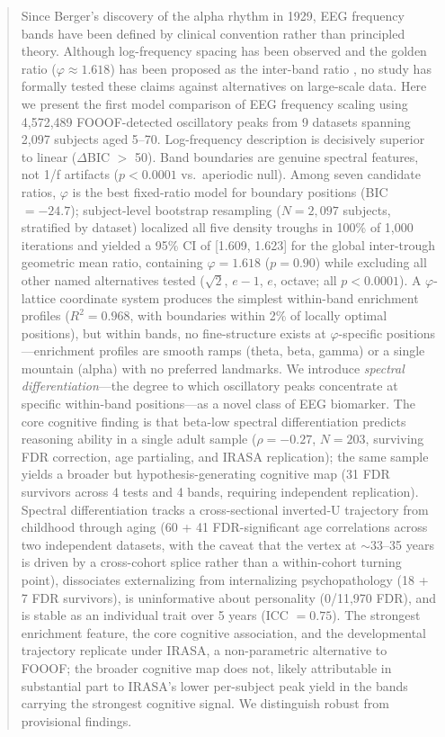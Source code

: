 \documentclass[11pt,a4paper]{article}
\newcommand{\phisym}{\varphi}
\begin{document}
\begin{abstract}
Since Berger's discovery of the alpha rhythm in 1929, EEG frequency bands have been defined by clinical convention rather than principled theory. Although log-frequency spacing has been observed \parencite{penttonen2003natural} and the golden ratio ($\phisym \approx 1.618$) has been proposed as the inter-band ratio \parencite{pletzer2010golden,kramer2023golden}, no study has formally tested these claims against alternatives on large-scale data. Here we present the first model comparison of EEG frequency scaling using 4,572,489 FOOOF-detected oscillatory peaks from 9 datasets spanning 2,097 subjects aged 5--70. Log-frequency description is decisively superior to linear ($\Delta$BIC $>$ 50). Band boundaries are genuine spectral features, not 1/f artifacts ($p < 0.0001$ vs.\ aperiodic null). Among seven candidate ratios, $\phisym$ is the best fixed-ratio model for boundary positions (BIC $= -24.7$); subject-level bootstrap resampling ($N = 2{,}097$ subjects, stratified by dataset) localized all five density troughs in 100\% of 1,000 iterations and yielded a 95\% CI of [1.609, 1.623] for the global inter-trough geometric mean ratio, containing $\phisym = 1.618$ ($p = 0.90$) while excluding all other named alternatives tested ($\sqrt{2}$, $e-1$, $e$, octave; all $p < 0.0001$). A $\phisym$-lattice coordinate system produces the simplest within-band enrichment profiles ($R^2 = 0.968$, with boundaries within 2\% of locally optimal positions), but within bands, no fine-structure exists at $\phisym$-specific positions---enrichment profiles are smooth ramps (theta, beta, gamma) or a single mountain (alpha) with no preferred landmarks. We introduce \emph{spectral differentiation}---the degree to which oscillatory peaks concentrate at specific within-band positions---as a novel class of EEG biomarker. The core cognitive finding is that beta-low spectral differentiation predicts reasoning ability in a single adult sample ($\rho = -0.27$, $N = 203$, surviving FDR correction, age partialing, and IRASA replication); the same sample yields a broader but hypothesis-generating cognitive map (31 FDR survivors across 4 tests and 4 bands, requiring independent replication). Spectral differentiation tracks a cross-sectional inverted-U trajectory from childhood through aging (60 + 41 FDR-significant age correlations across two independent datasets, with the caveat that the vertex at $\sim$33--35 years is driven by a cross-cohort splice rather than a within-cohort turning point), dissociates externalizing from internalizing psychopathology (18 + 7 FDR survivors), is uninformative about personality (0/11,970 FDR), and is stable as an individual trait over 5 years (ICC $= 0.75$). The strongest enrichment feature, the core cognitive association, and the developmental trajectory replicate under IRASA, a non-parametric alternative to FOOOF; the broader cognitive map does not, likely attributable in substantial part to IRASA's lower per-subject peak yield in the bands carrying the strongest cognitive signal. We distinguish robust from provisional findings. 
\end{abstract}
\end{document}
